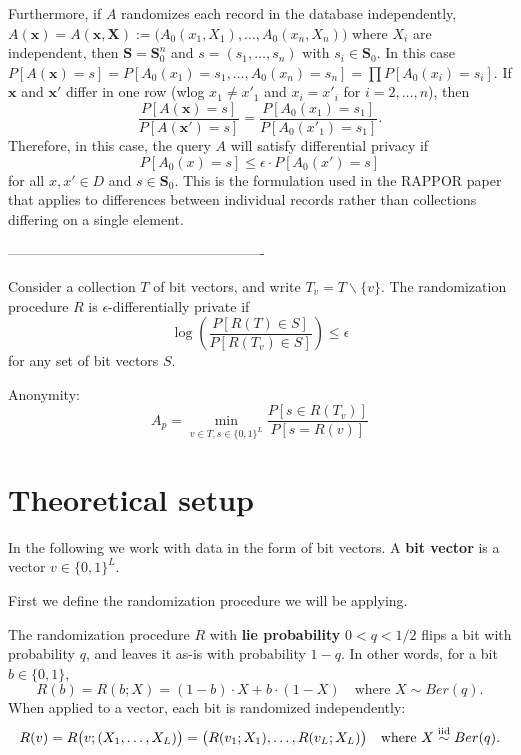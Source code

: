 \documentclass[11pt,draft]{article}
\begin{document}
Furthermore, if $A$ randomizes each record in the database independently,
\ie $A(\boldsymbol{x}) = A(\boldsymbol{x}, \boldsymbol{X}) := 
\big(A_0(x_1, X_1),\dots,A_0(x_n,X_n)\big)$
where $X_i$ are independent,
then $\boldsymbol{S} = \boldsymbol{S}_0^n$ and $s = (s_1,\dots,s_n)$ with 
$s_i \in \boldsymbol{S}_0$. 
In this case
$P[A(\boldsymbol{x}) = s] = P[A_0(x_1) = s_1,\dots,A_0(x_n) = s_n]
= \prod P[A_0(x_i) = s_i]$.
If $\boldsymbol{x}$ and $\boldsymbol{x'}$ differ in one row (wlog $x_1 \neq x'_1$ and $x_i = x'_i$ for $i = 2,\dots,n$),
then
\[ \frac{P[A(\boldsymbol{x}) = s]}{P[A(\boldsymbol{x'}) = s]} = 
\frac{P[A_0(x_1) = s_1]}{P[A_0(x'_1) = s_1]}. \]
Therefore, in this case, the query $A$ will satisfy differential privacy if
\[ P[A_0(x) = s] \leq \epsilon \cdot P[A_0(x') = s] \]
for all $x,x' \in D$ and $s \in \boldsymbol{S}_0$.
This is the formulation used in the RAPPOR paper that applies to differences between individual records rather than collections differing on a single element.


-------------------------------------------------------

Consider a collection $T$ of bit vectors, and write $T_v = T\backslash\{v\}$.
The randomization procedure $R$ is $\epsilon$-differentially private if
\[ \log\left(\frac{P[R(T)\in S]}{P[R(T_v)\in S]}\right) \leq \epsilon \]
for any set of bit vectors $S$.

Anonymity:
\[
    A_p = \min_{v \in T, s \in \{0,1\}^L} \frac{P[s \in R(T_v)]}{P[s = R(v)]}
\]

\section{Theoretical setup}

In the following we work with data in the form of bit vectors.
A \textbf{bit vector} is a vector $v \in \{0,1\}^L$.

First we define the randomization procedure we will be applying.

\begin{defn}
The randomization procedure $R$ with \textbf{lie probability} $0 < q < 1/2$ flips a bit with probability $q$, and leaves it as-is with probability $1-q$.
In other words, for a bit $b \in \{0,1\}$,
\[ R(b) = R(b; X) = (1-b)\cdot X + b \cdot (1-X) \quad\text{where } X\sim Ber(q). \]
When applied to a vector, each bit is randomized independently:
\[ R(v) = R\big(v; (X_1,\dots,X_L)\big) = 
    \big(R(v_1; X_1),\dots,R(v_L; X_L)\big) 
\quad\text{where } X \stackrel{\text{iid}}{\sim} Ber(q). \]
\end{defn}
\end{document}
